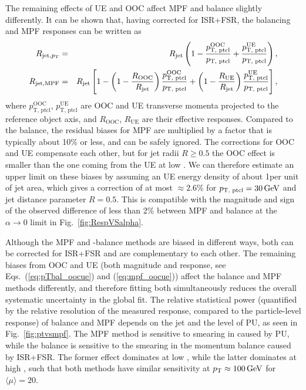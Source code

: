 \documentclass[11pt,twoside,a4paper,cmspaper,final,collab]{cms-tdr}
\begin{document}
The remaining effects of UE and OOC affect MPF and \pt balance slightly differently.
It can be shown that, having corrected for ISR+FSR, the balancing and MPF responses can be written as
\begin{eqnarray}
R_{\text{jet}, p_{\mathrm{T}}}
&=& R_\text{jet}\left(1 - \frac{p_\text{T, ptcl}^\mathrm{OOC}}{p_\text{T, ptcl}} + \frac{p_\text{T, ptcl}^\mathrm{UE}}{p_\text{T, ptcl}}\right),\label{eq:pTbal_oocue}\\
R_\mathrm{jet, MPF}
&=& R_\text{jet}\left[1 - \left(1-\frac{R_\mathrm{OOC}}{R_\text{jet}}\right)\frac{p_\text{T, ptcl}^\mathrm{OOC}}{p_\text{T, ptcl}} + \left(1-\frac{R_\mathrm{ UE}}{R_\text{jet}}\right)\frac{p_\text{T, ptcl}^\mathrm{UE}}{p_\text{T, ptcl}}\right] \label{eq:mpf_oocue},
\end{eqnarray}
where $p_\text{T, ptcl}^\mathrm{OOC}$, $p_\text{T, ptcl}^\mathrm{UE}$ are OOC and UE transverse momenta projected to the reference object axis, and $R_\mathrm{OOC}$, $R_\mathrm{UE}$ are their effective responses. Compared to the \pt balance, the residual biases for MPF are multiplied by a factor that is typically about 10\% or less, and can be safely ignored. The corrections for OOC and UE compensate each other, but for jet radii $R\geq 0.5$ the OOC effect is smaller than the one coming from the UE at low \pt. We can therefore estimate an upper limit on these biases by assuming an UE energy density of about 1\GeV per unit of jet area, which gives a correction of at most ${\approx} 2.6$\% for $p_\text{T, ptcl}=30\,\text{Ge\hspace{-.08em}V}$ and jet distance parameter $R=0.5$. This is compatible with the magnitude and sign of the observed difference of less than 2\% between MPF and \pt balance at the $\alpha\to 0$ limit in Fig.~\ref{fig:RespVSalpha}.

Although the MPF and \pt-balance methods are biased in different ways, both can be corrected for ISR+FSR and are complementary to each other. The remaining biases from OOC and UE (both magnitude and response, see Eqs.~(\ref{eq:pTbal_oocue}) and (\ref{eq:mpf_oocue})) affect the \pt balance and MPF methods differently, and therefore fitting both simultaneously reduces the overall systematic uncertainty in the global fit.  The relative statistical power (quantified by the relative resolution of the measured response, compared to the particle-level response) of \pt balance and MPF depends on the jet \pt and the level of PU, as seen in Fig.~\ref{fig:ptvsmpf}. The MPF method is sensitive to smearing in \ptvecmiss caused by PU, while the \pt balance is sensitive to the smearing in the momentum balance caused by ISR+FSR. The former effect dominates at low \pt, while the latter dominates at high \pt, such that both methods have similar sensitivity at $p_{\mathrm{T}}\approx 100\,\text{Ge\hspace{-.08em}V}$ for $\langle\mu\rangle=20$.
\end{document}
